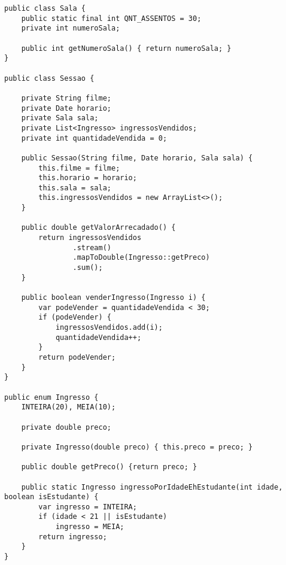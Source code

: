 \documentclass{lib/eng_softdoc}
\begin{document}
\begin{lstlisting}
public class Sala {
	public static final int QNT_ASSENTOS = 30;
	private int numeroSala;

	public int getNumeroSala() { return numeroSala; }
}

public class Sessao {

	private String filme;
	private Date horario;
	private Sala sala;
	private List<Ingresso> ingressosVendidos;
	private int quantidadeVendida = 0;

	public Sessao(String filme, Date horario, Sala sala) {
		this.filme = filme;
		this.horario = horario;
		this.sala = sala;
		this.ingressosVendidos = new ArrayList<>();
	}

	public double getValorArrecadado() {
		return ingressosVendidos
				.stream()
				.mapToDouble(Ingresso::getPreco)
				.sum();
	}

	public boolean venderIngresso(Ingresso i) {
		var podeVender = quantidadeVendida < 30;
		if (podeVender) {
			ingressosVendidos.add(i);
			quantidadeVendida++;
		}
		return podeVender;
	}
}

public enum Ingresso {
	INTEIRA(20), MEIA(10);

	private double preco;

	private Ingresso(double preco) { this.preco = preco; }

	public double getPreco() {return preco; }

	public static Ingresso ingressoPorIdadeEhEstudante(int idade, boolean isEstudante) {
		var ingresso = INTEIRA;
		if (idade < 21 || isEstudante)
			ingresso = MEIA;
		return ingresso;
	}
}
\end{lstlisting}
\end{document}
